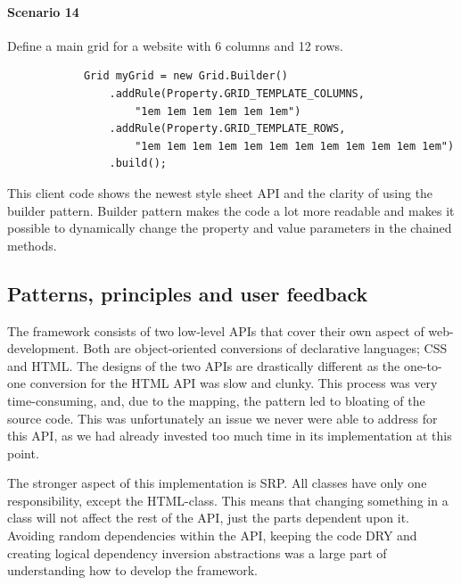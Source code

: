 \documentclass[12pt]{article}
\begin{document}
    \paragraph{Scenario 14}
    Define a main grid for a website with 6 columns and 12 rows.

    \begin{shaded}
        \begin{lstlisting}
            Grid myGrid = new Grid.Builder()
                .addRule(Property.GRID_TEMPLATE_COLUMNS,
                    "1em 1em 1em 1em 1em 1em")
                .addRule(Property.GRID_TEMPLATE_ROWS,
                    "1em 1em 1em 1em 1em 1em 1em 1em 1em 1em 1em 1em")
                .build();
        \end{lstlisting}
    \end{shaded}

    This client code shows the newest style sheet API and the clarity of using the builder pattern. Builder pattern makes the code a lot more readable and makes it possible to dynamically change the property and value parameters in the chained methods. 

    \subsection{Patterns, principles and user feedback}

    The framework consists of two low-level APIs that cover their own aspect of web-development. Both are object-oriented conversions of declarative languages; CSS and HTML. The designs of the two APIs are drastically different as the one-to-one conversion for the HTML API was slow and clunky. This process was very time-consuming, and, due to the mapping, the pattern led to bloating of the source code. This was unfortunately an issue we never were able to address for this API, as we had already invested too much time in its implementation at this point.

    The stronger aspect of this implementation is SRP. All classes have only one responsibility, except the HTML-class. This means that changing something in a class will not affect the rest of the API, just the parts dependent upon it. Avoiding random dependencies within the API, keeping the code DRY and creating logical dependency inversion abstractions was a large part of understanding how to develop the framework.
\end{document}
